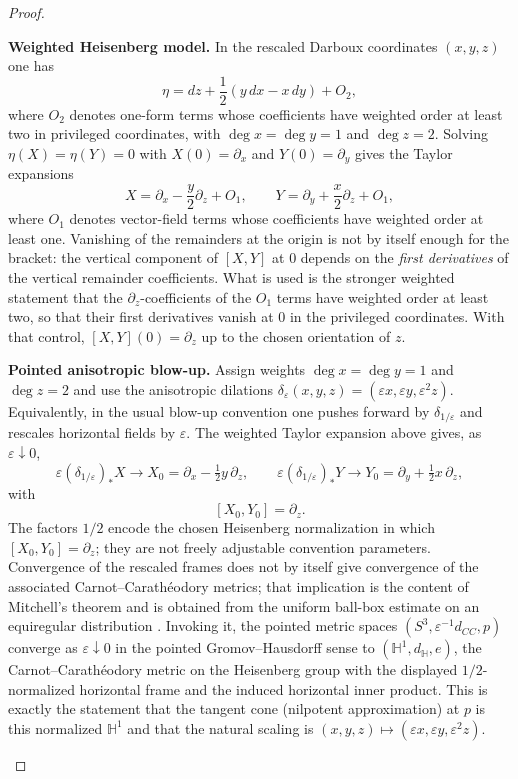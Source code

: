 \documentclass[11pt]{article}
\begin{document}
\begin{proof}
\begin{proofsteps}
\item \textbf{Weighted Heisenberg model.}
In the rescaled Darboux coordinates $(x,y,z)$ one has
\[
\eta=dz+\frac12(y\,dx-x\,dy)+O_2,
\]
where $O_2$ denotes one-form terms whose coefficients have weighted order at least two in privileged coordinates, with $\deg x=\deg y=1$ and $\deg z=2$.  Solving
$\eta(X)=\eta(Y)=0$ with $X(0)=\partial_x$ and $Y(0)=\partial_y$ gives the Taylor expansions
\[
X=\partial_x-\frac y2\partial_z+O_1,
\qquad
Y=\partial_y+\frac x2\partial_z+O_1,
\]
where $O_1$ denotes vector-field terms whose coefficients have weighted order
at least one.  Vanishing of the remainders at the origin is not by itself
enough for the bracket: the vertical component of $[X,Y]$ at $0$ depends on
the \emph{first derivatives} of the vertical remainder coefficients.  What is
used is the stronger weighted statement that the $\partial_z$-coefficients of
the $O_1$ terms have weighted order at least two, so that their first
derivatives vanish at $0$ in the privileged coordinates.  With that control,
$[X,Y](0)=\partial_z$ up to the chosen orientation of $z$.

\item \textbf{Pointed anisotropic blow-up.}
Assign weights $\deg x=\deg y=1$ and $\deg z=2$ and use the anisotropic dilations
$\delta_\varepsilon(x,y,z)=(\varepsilon x,\varepsilon y,\varepsilon^2 z)$.  Equivalently, in the usual blow-up convention
one pushes forward by $\delta_{1/\varepsilon}$ and rescales horizontal fields by $\varepsilon$.  The weighted Taylor
expansion above gives, as \(\varepsilon\downarrow0\),
\[
\varepsilon(\delta_{1/\varepsilon})_*X\longrightarrow
X_0=\partial_x-\tfrac12 y\,\partial_z,
\qquad
\varepsilon(\delta_{1/\varepsilon})_*Y\longrightarrow
Y_0=\partial_y+\tfrac12 x\,\partial_z,
\]
with
\[
[X_0,Y_0]=\partial_z.
\]
The factors $1/2$ encode the chosen Heisenberg normalization in which $[X_0,Y_0]=\partial_z$; they are not freely adjustable convention parameters.  Convergence of the
rescaled frames does not by itself give convergence of the associated
Carnot--Carath\'eodory metrics; that implication is the content of Mitchell's
theorem and is obtained from the uniform ball-box estimate on an equiregular
distribution \cite{mitchell1985cc}.  Invoking it, the pointed metric
spaces $(S^3,\varepsilon^{-1}d_{CC},p)$ converge as \(\varepsilon\downarrow0\) in the pointed Gromov--Hausdorff sense to
$(\mathbb H^1,d_{\mathbb H},e)$, the Carnot--Carath\'eodory metric on the Heisenberg group with the displayed
\(1/2\)-normalized horizontal frame and the induced horizontal inner product. This is exactly the
statement that the tangent cone (nilpotent approximation) at $p$ is this normalized $\mathbb H^1$ and that the natural scaling is
$(x,y,z)\mapsto(\varepsilon x,\varepsilon y,\varepsilon^2 z)$.
\end{proofsteps}
\end{proof}
\end{document}
